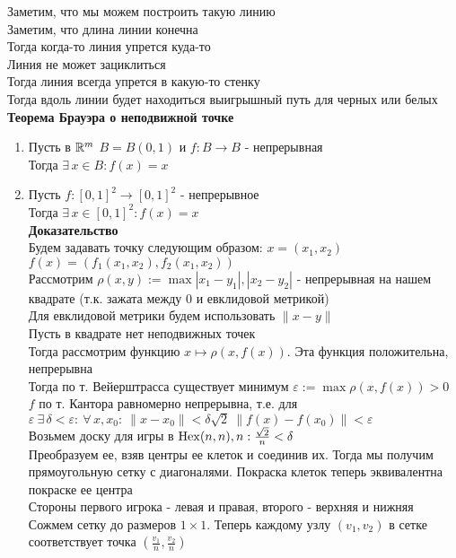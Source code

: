 \documentclass[12pt]{article}
\begin{document}
Заметим, что мы можем построить такую линию\\
Заметим, что длина линии конечна\\
Тогда когда-то линия упрется куда-то\\
Линия не может зациклиться\\
Тогда линия всегда упрется в какую-то стенку\\
Тогда вдоль линии будет находиться выигрышный путь для черных или белых\\
\textbf{Теорема Брауэра о неподвижной точке}
\begin{enumerate}
    \item Пусть в $\mathbb{R}^m$ $B = B(0,1)$ и $f: B \rightarrow B$ - непрерывная\\
    Тогда $\exists\,x\in B: f(x)=x$
    \item Пусть $f:[0,1]^2 \rightarrow [0,1]^2$ - непрерывное\\
    Тогда $\exists\,x\in [0,1]^2: f(x) = x$\\
    \textbf{Доказательство}\\
    Будем задавать точку следующим образом: $x = (x_1, x_2)$\\
    $f(x) = (f_1(x_1, x_2), f_2(x_1, x_2))$\\
    Рассмотрим $\rho(x, y) := \max |x_1 - y_1|, |x_2 - y_2|$ - непрерывная на нашем квадрате (т.к. зажата между 0 и евклидовой метрикой)\\
    Для евклидовой метрики будем использовать $\|x-y\|$\\
    Пусть в квадрате нет неподвижных точек\\
    Тогда рассмотрим функцию $x\mapsto \rho(x, f(x))$. Эта функция положительна, непрерывна\\
    Тогда по т. Вейерштрасса существует минимум $\varepsilon := \max \rho(x, f(x)) > 0$\\
    $f$ по т. Кантора равномерно непрерывна, т.е. для $\varepsilon\ \exists\,\delta < \varepsilon:\ \forall\,x,x_0:\ \|x-x_0\| < \delta\sqrt2\ \|f(x)-f(x_0)\| < \varepsilon$\\
    Возьмем доску для игры в $\operatorname{Hex}(n, n), n: \frac {\sqrt{2}}{n} < \delta$\\
    Преобразуем ее, взяв центры ее клеток и соединив их. Тогда мы получим прямоугольную сетку с диагоналями. Покраска клеток теперь эквивалентна покраске ее центра\\
    Стороны первого игрока - левая и правая, второго - верхняя и нижняя\\
    Сожмем сетку до размеров $1\times1$. Теперь каждому узлу $(v_1, v_2)$ в сетке соответствует точка $(\frac{v_1}{n}, \frac{v_2}{n})$\\

\end{enumerate}
\end{document}
